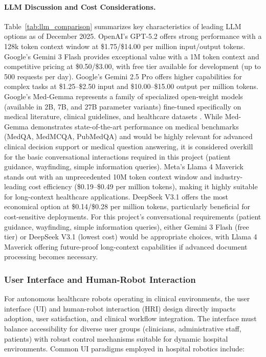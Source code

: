 \paragraph{LLM Discussion and Cost Considerations.}
Table~\ref{tab:llm_comparison} summarizes key characteristics of leading LLM options as of December 2025. OpenAI's GPT-5.2 offers strong performance with a 128k token context window at \$1.75/\$14.00 per million input/output tokens. Google's Gemini 3 Flash provides exceptional value with a 1M token context and competitive pricing at \$0.50/\$3.00, with free tier available for development (up to 500 requests per day). Google's Gemini 2.5 Pro offers higher capabilities for complex tasks at \$1.25--\$2.50 input and \$10.00--\$15.00 output per million tokens. Google's Med-Gemma represents a family of specialized open-weight models (available in 2B, 7B, and 27B parameter variants) fine-tuned specifically on medical literature, clinical guidelines, and healthcare datasets \cite{medgemini2024}. While Med-Gemma demonstrates state-of-the-art performance on medical benchmarks (MedQA, MedMCQA, PubMedQA) and would be highly relevant for advanced clinical decision support or medical question answering, it is considered overkill for the basic conversational interactions required in this project (patient guidance, wayfinding, simple information queries). Meta's Llama 4 Maverick stands out with an unprecedented 10M token context window and industry-leading cost efficiency (\$0.19--\$0.49 per million tokens), making it highly suitable for long-context healthcare applications. DeepSeek V3.1 offers the most economical option at \$0.14/\$0.28 per million tokens, particularly beneficial for cost-sensitive deployments. For this project's conversational requirements (patient guidance, wayfinding, simple information queries), either Gemini 3 Flash (free tier) or DeepSeek V3.1 (lowest cost) would be appropriate choices, with Llama 4 Maverick offering future-proof long-context capabilities if advanced document processing becomes necessary.

\subsubsection{User Interface and Human-Robot Interaction}
For autonomous healthcare robots operating in clinical environments, the user interface (UI) and human-robot interaction (HRI) design directly impacts adoption, user satisfaction, and clinical workflow integration. The interface must balance accessibility for diverse user groups (clinicians, administrative staff, patients) with robust control mechanisms suitable for dynamic hospital environments. Common UI paradigms employed in hospital robotics include:

